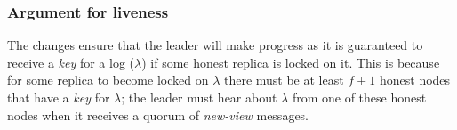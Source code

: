 \subsubsection{Argument for liveness}
The changes ensure that the leader will make progress as it is guaranteed to receive a \textit{key} for a log ($\lambda$) if some honest replica is locked on it. This is because for some replica to become locked on $\lambda$ there must be at least $f + 1$ honest nodes that have a \textit{key} for $\lambda$; the leader must hear about $\lambda$ from one of these honest nodes when it receives a quorum of \textit{new-view} messages.

